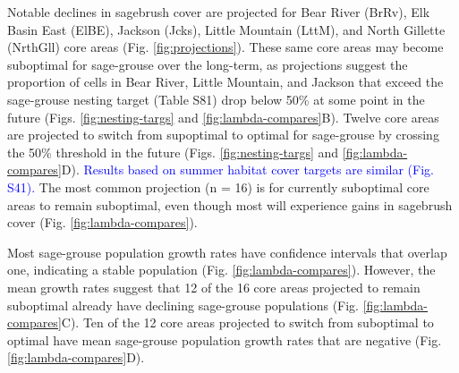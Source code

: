 \documentclass[
  12pt,
]{article}
\begin{document}
Notable declines in sagebrush cover are projected for Bear River (BrRv), Elk Basin East (ElBE), Jackson (Jcks), Little Mountain (LttM), and North Gillette (NrthGll) core areas (Fig. \ref{fig:projections}).
These same core areas may become suboptimal for sage-grouse over the long-term, as projections suggest the proportion of cells in Bear River, Little Mountain, and Jackson that exceed the sage-grouse nesting target (Table S81) drop below 50\% at some point in the future (Figs. \ref{fig:nesting-targs} and \ref{fig:lambda-compares}B).
Twelve core areas are projected to switch from supoptimal to optimal for sage-grouse by crossing the 50\% threshold in the future (Figs. \ref{fig:nesting-targs} and \ref{fig:lambda-compares}D).
\textcolor{blue}{Results based on summer habitat cover targets are similar (Fig. S41).}
The most common projection (n = 16) is for currently suboptimal core areas to remain suboptimal, even though most will experience gains in sagebrush cover (Fig. \ref{fig:lambda-compares}).

Most sage-grouse population growth rates have confidence intervals that overlap one, indicating a stable population (Fig. \ref{fig:lambda-compares}).
However, the mean growth rates suggest that 12 of the 16 core areas projected to remain suboptimal already have declining sage-grouse populations (Fig. \ref{fig:lambda-compares}C).
Ten of the 12 core areas projected to switch from suboptimal to optimal have mean sage-grouse population growth rates that are negative (Fig. \ref{fig:lambda-compares}D).
\end{document}
